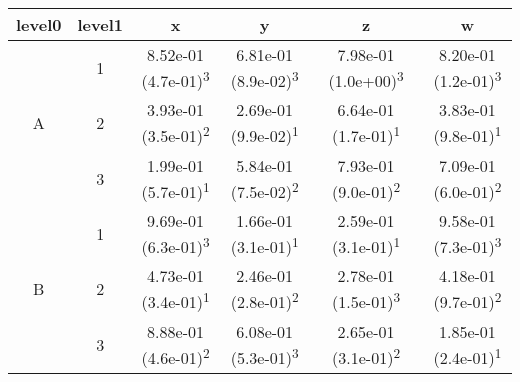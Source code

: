 \begin{tabular}{cccccc}
\toprule
level0 & level1&x&y&z&w\tabularnewline
\midrule
\multirow{3}{*}{A}&1& 8.52e-01 (4.7e-01)\textsuperscript{3}& 6.81e-01 (8.9e-02)\textsuperscript{3}& 7.98e-01 (1.0e+00)\textsuperscript{3}& 8.20e-01 (1.2e-01)\textsuperscript{3}\tabularnewline
&2& 3.93e-01 (3.5e-01)\textsuperscript{2}& 2.69e-01 (9.9e-02)\textsuperscript{1}& 6.64e-01 (1.7e-01)\textsuperscript{1}& 3.83e-01 (9.8e-01)\textsuperscript{1}\tabularnewline
&3& 1.99e-01 (5.7e-01)\textsuperscript{1}& 5.84e-01 (7.5e-02)\textsuperscript{2}& 7.93e-01 (9.0e-01)\textsuperscript{2}& 7.09e-01 (6.0e-01)\textsuperscript{2}\tabularnewline
\midrule
\multirow{3}{*}{B}&1& 9.69e-01 (6.3e-01)\textsuperscript{3}& 1.66e-01 (3.1e-01)\textsuperscript{1}& 2.59e-01 (3.1e-01)\textsuperscript{1}& 9.58e-01 (7.3e-01)\textsuperscript{3}\tabularnewline
&2& 4.73e-01 (3.4e-01)\textsuperscript{1}& 2.46e-01 (2.8e-01)\textsuperscript{2}& 2.78e-01 (1.5e-01)\textsuperscript{3}& 4.18e-01 (9.7e-01)\textsuperscript{2}\tabularnewline
&3& 8.88e-01 (4.6e-01)\textsuperscript{2}& 6.08e-01 (5.3e-01)\textsuperscript{3}& 2.65e-01 (3.1e-01)\textsuperscript{2}& 1.85e-01 (2.4e-01)\textsuperscript{1}\tabularnewline
\bottomrule
\end{tabular}
